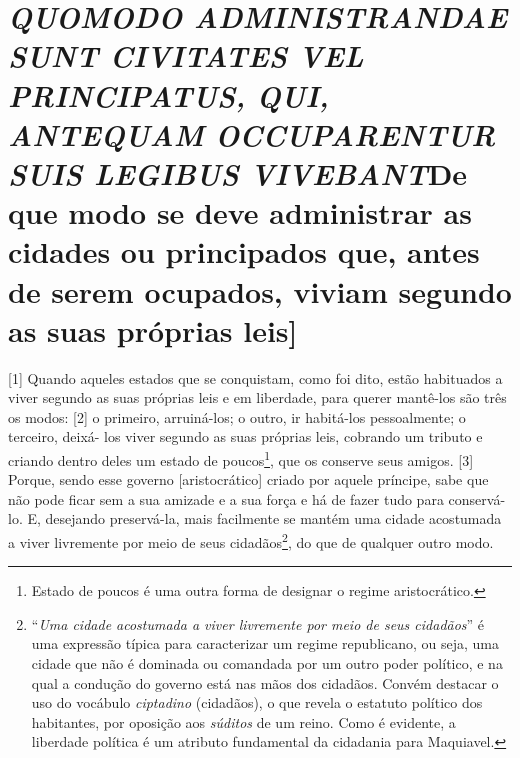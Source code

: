 \quebra\section{\emph{QUOMODO ADMINISTRANDAE SUNT CIVITATES VEL PRINCIPATUS, QUI,
ANTEQUAM OCCUPARENTUR SUIS LEGIBUS VIVEBANT}\break {[}De que modo se deve administrar as cidades ou principados que, antes de serem ocupados, viviam segundo as suas próprias leis{]}}

{[}1{]} Quando aqueles estados que se conquistam, como foi dito, estão
habituados a viver segundo as suas próprias leis e em liberdade, para
querer mantê-los são três os modos: {[}2{]} o primeiro, arruiná-los; o
outro, ir habitá-los pessoalmente; o terceiro, deixá- los viver segundo
as suas próprias leis, cobrando um tributo e criando dentro deles um
estado de poucos\footnote{Estado de poucos é uma outra forma de designar
  o regime aristocrático.}, que os conserve seus amigos. {[}3{]} Porque,
sendo esse governo {[}aristocrático{]} criado por aquele príncipe, sabe
que não pode ficar sem a sua amizade e a sua força e há de fazer tudo
para conservá-lo. E, desejando preservá-la, mais facilmente se mantém
uma cidade acostumada a viver livremente por meio de seus
cidadãos\footnote{``\emph{Uma cidade acostumada a viver livremente por
  meio de seus cidadãos}'' é uma expressão típica para caracterizar um
  regime republicano, ou seja, uma cidade que não é dominada ou
  comandada por um outro poder político, e na qual a condução do governo
  está nas mãos dos cidadãos. Convém destacar o uso do vocábulo
  \emph{ciptadino} (cidadãos), o que revela o estatuto político dos
  habitantes, por oposição aos \emph{súditos} de um reino. Como é
  evidente, a liberdade política é um atributo fundamental da cidadania
  para Maquiavel.}, do que de qualquer outro modo.

